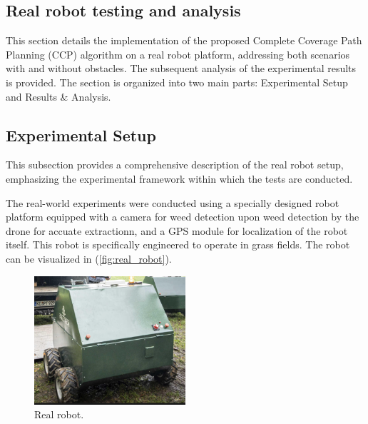 
\subsection{Real robot testing and analysis} 

This section details the implementation of the proposed Complete Coverage Path Planning (CCP) algorithm on a real robot platform, addressing both scenarios with and without obstacles. The subsequent analysis of the experimental results is provided. The section is organized into two main parts: Experimental Setup and Results \& Analysis. 

\subsection{Experimental Setup} 

This subsection provides a comprehensive description of the real robot setup, emphasizing the experimental framework within which the tests are conducted.   

\vspace*{6mm}   


The real-world experiments were conducted using a specially designed robot platform equipped with a camera for weed detection upon weed detection by the drone for accuate extractionn, and a GPS module for localization of the robot itself. This robot is specifically engineered to operate in grass fields. The robot can be visualized in (\autoref{fig:real_robot}).   
\begin{figure}[htbp]
    \centering
    \includegraphics[width=0.5\textwidth]{Images/real_robot/robot.png}
    \caption{Real robot.}
    \label{fig:real_robot}
\end{figure}


\vspace*{6mm}   


